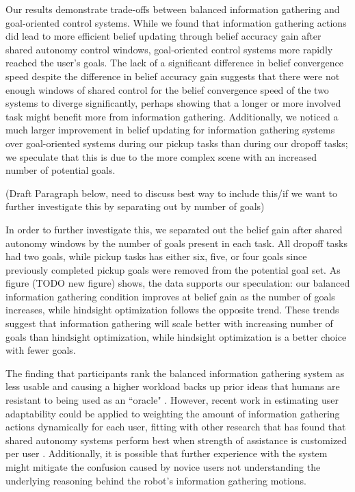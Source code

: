 \documentclass[conference]{IEEEtran}
\begin{document}
Our results demonstrate trade-offs between balanced information gathering and goal-oriented control systems. While we found that information gathering actions did lead to more efficient belief updating through belief accuracy gain after shared autonomy control windows, goal-oriented control systems more rapidly reached the user's goals. The lack of a significant difference in belief convergence speed despite the difference in belief accuracy gain suggests that there were not enough windows of shared control for the belief convergence speed of the two systems to diverge significantly, perhaps showing that a longer or more involved task might benefit more from information gathering. Additionally, we noticed a much larger improvement in belief updating for information gathering systems over goal-oriented systems during our pickup tasks than during our dropoff tasks; we speculate that this is due to the more complex scene with an increased number of potential goals. 

(Draft Paragraph below, need to discuss best way to include this/if we want to further investigate this by separating out by number of goals)

In order to further investigate this, we separated out the belief gain after shared autonomy windows by the number of goals present in each task. All dropoff tasks had two goals, while pickup tasks has either six, five, or four goals since previously completed pickup goals were removed from the potential goal set. As figure (TODO new figure) shows, the data supports our speculation: our balanced information gathering condition improves at belief gain as the number of goals increases, while hindsight optimization follows the opposite trend. These trends suggest that information gathering will scale better with increasing number of goals than hindsight optimization, while hindsight optimization is a better choice with fewer goals.

The finding that participants rank the balanced information gathering system as less usable and causing a higher workload backs up prior ideas that humans are resistant to being used as an ``oracle" \cite{javdani2015shared}. However, recent work in estimating user adaptability \cite{nikolaidis2017human} could be applied to weighting the amount of information gathering actions dynamically for each user, fitting with other research that has found that shared autonomy systems perform best when strength of assistance is customized per user \cite{gopinath2017human}. Additionally, it is possible that further experience with the system might mitigate the confusion caused by novice users not understanding the underlying reasoning behind the robot's information gathering motions. 
\end{document}
